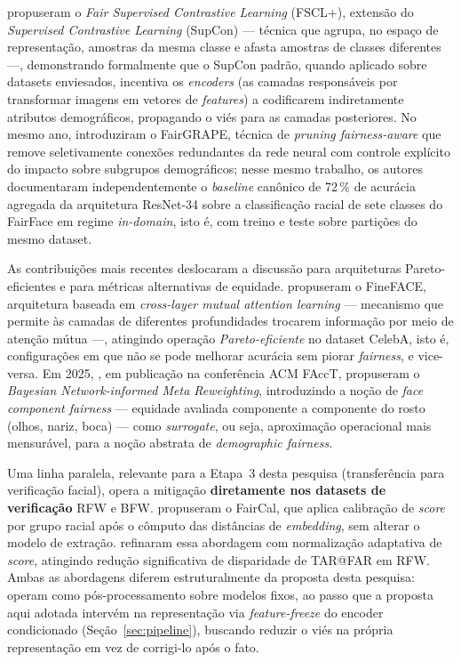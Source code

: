  propuseram o \emph{Fair Supervised Contrastive Learning} (FSCL+), extensão do \emph{Supervised Contrastive Learning} (SupCon) --- técnica que agrupa, no espaço de representação, amostras da mesma classe e afasta amostras de classes diferentes ---, demonstrando formalmente que o SupCon padrão, quando aplicado sobre datasets enviesados, incentiva os \emph{encoders} (as camadas responsáveis por transformar imagens em vetores de \emph{features}) a codificarem indiretamente atributos demográficos, propagando o viés para as camadas posteriores. No mesmo ano,  introduziram o FairGRAPE, técnica de \emph{pruning fairness-aware} que remove seletivamente conexões redundantes da rede neural com controle explícito do impacto sobre subgrupos demográficos; nesse mesmo trabalho, os autores documentaram independentemente o \emph{baseline} canônico de 72\,\% de acurácia agregada da arquitetura ResNet-34 sobre a classificação racial de sete classes do FairFace em regime \emph{in-domain}, isto é, com treino e teste sobre partições do mesmo dataset.

As contribuições mais recentes deslocaram a discussão para arquiteturas Pareto-eficientes e para métricas alternativas de equidade.  propuseram o FineFACE, arquitetura baseada em \emph{cross-layer mutual attention learning} --- mecanismo que permite às camadas de diferentes profundidades trocarem informação por meio de atenção mútua ---, atingindo operação \emph{Pareto-eficiente} no dataset CelebA, isto é, configurações em que não se pode melhorar acurácia sem piorar \emph{fairness}, e vice-versa. Em 2025, , em publicação na conferência ACM FAccT, propuseram o \emph{Bayesian Network-informed Meta Reweighting}, introduzindo a noção de \emph{face component fairness} --- equidade avaliada componente a componente do rosto (olhos, nariz, boca) --- como \emph{surrogate}, ou seja, aproximação operacional mais mensurável, para a noção abstrata de \emph{demographic fairness}.

Uma linha paralela, relevante para a Etapa~3 desta pesquisa (transferência para verificação facial), opera a mitigação \textbf{diretamente nos datasets de verificação} RFW e BFW.  propuseram o FairCal, que aplica calibração de \emph{score} por grupo racial após o cômputo das distâncias de \emph{embedding}, sem alterar o modelo de extração.  refinaram essa abordagem com normalização adaptativa de \emph{score}, atingindo redução significativa de disparidade de TAR@FAR em RFW. Ambas as abordagens diferem estruturalmente da proposta desta pesquisa: operam como pós-processamento sobre modelos fixos, ao passo que a proposta aqui adotada intervém na representação via \emph{feature-freeze} do encoder condicionado (Seção~\ref{sec:pipeline}), buscando reduzir o viés na própria representação em vez de corrigi-lo após o fato.

